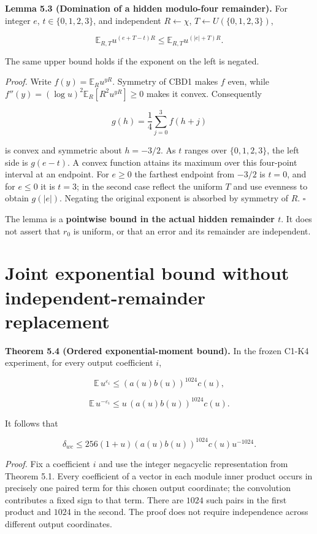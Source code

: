 \documentclass[
  11pt,
  a4paper,
  oneside]{report}
\begin{document}
\textbf{Lemma 5.3 (Domination of a hidden modulo-four remainder).} For
integer \(e\), \(t\in\{0,1,2,3\}\), and independent \(R\leftarrow\chi\),
\(T\leftarrow U(\{0,1,2,3\})\),

\[
\mathbb E_{R,T}u^{(e+T-t)R}
\le \mathbb E_{R,T}u^{(|e|+T)R}.
\]

The same upper bound holds if the exponent on the left is negated.

\emph{Proof.} Write \(f(y)=\mathbb E_R u^{yR}\). Symmetry of CBD1 makes
\(f\) even, while \(f''(y)=(\log u)^2\mathbb E_R[R^2u^{yR}]\ge0\) makes
it convex. Consequently

\[
g(h)=\frac14\sum_{j=0}^3 f(h+j)
\]

is convex and symmetric about \(h=-3/2\). As \(t\) ranges over
\(\{0,1,2,3\}\), the left side is \(g(e-t)\). A convex function attains
its maximum over this four-point interval at an endpoint. For \(e\ge0\)
the farthest endpoint from \(-3/2\) is \(t=0\), and for \(e\le0\) it is
\(t=3\); in the second case reflect the uniform \(T\) and use evenness
to obtain \(g(|e|)\). Negating the original exponent is absorbed by
symmetry of \(R\). \(\square\)

The lemma is a \textbf{pointwise bound in the actual hidden remainder
\(t\)}. It does not assert that \(r_0\) is uniform, or that an error and
its remainder are independent.

\section{Joint exponential bound without independent-remainder
replacement}\label{joint-exponential-bound-without-independent-remainder-replacement}

\textbf{Theorem 5.4 (Ordered exponential-moment bound).} In the frozen
C1-K4 experiment, for every output coefficient \(i\),

\[
\mathbb E\,u^{\varepsilon_i}
\le (a(u)b(u))^{1024}c(u),
\]

\[
\mathbb E\,u^{-\varepsilon_i}
\le u\,(a(u)b(u))^{1024}c(u).
\]

It follows that

\[
\boxed{\quad
\delta_{wc}\le
256(1+u)(a(u)b(u))^{1024}c(u)u^{-1024}.
\quad}
\]

\emph{Proof.} Fix a coefficient \(i\) and use the integer negacyclic
representation from Theorem 5.1. Every coefficient of a vector in each
module inner product occurs in precisely one paired term for this chosen
output coordinate; the convolution contributes a fixed sign to that
term. There are \(1024\) such pairs in the first product and \(1024\) in
the second. The proof does not require independence across different
output coordinates.
\end{document}
